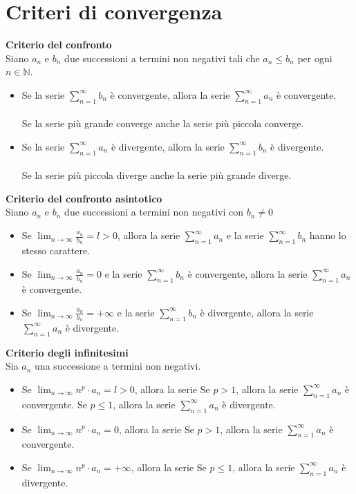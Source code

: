 \documentclass{article}
\begin{document}
\section*{Criteri di convergenza}
\textbf{Criterio del confronto}\\
Siano $a_n$ e $b_n$ due successioni a termini non negativi tali che $a_n \leq b_n$ per ogni $n \in \mathbb{N}$.
\begin{itemize}
    \item Se la serie $\sum_{n=1}^\infty b_n$ è convergente, allora la serie
          $\sum_{n=1}^\infty a_n$ è convergente.\\\\ Se la serie più grande converge
          anche la serie più piccola converge.
    \item Se la serie $\sum_{n=1}^\infty a_n$ è divergente, allora la serie
          $\sum_{n=1}^\infty b_n$ è divergente.\\\\ Se la serie più piccola diverge anche
          la serie più grande diverge.
\end{itemize}
\textbf{Criterio del confronto asintotico}\\
Siano $a_n$ e $b_n$ due successioni a termini non negativi con $b_n \ne 0$
\begin{itemize}
    \item Se $\lim_{n \to \infty} \frac{a_n}{b_n} = l > 0$, allora la serie
          $\sum_{n=1}^\infty a_n$ e la serie $\sum_{n=1}^\infty b_n$ hanno lo stesso
          carattere.
    \item Se $\lim_{n \to \infty} \frac{a_n}{b_n} = 0$ e la serie $\sum_{n=1}^\infty b_n$
          è convergente, allora la serie $\sum_{n=1}^\infty a_n$ è convergente.
    \item Se $\lim_{n \to \infty} \frac{a_n}{b_n} = +\infty$ e la serie
          $\sum_{n=1}^\infty b_n$ è divergente, allora la serie $\sum_{n=1}^\infty a_n$ è
          divergente.
\end{itemize}
\textbf{Criterio degli infinitesimi}\\
Sia $a_n$ una successione a termini non negativi.
\begin{itemize}
    \item Se $\lim_{n \to \infty} n^p \cdot a_n = l>0$, allora la serie
          \subitem Se $p>1$, allora la serie $\sum_{n=1}^\infty a_n$ è convergente.
            \subitem Se $p \leq 1$, allora la serie $\sum_{n=1}^\infty a_n$ è divergente.
    \item Se $\lim_{n \to \infty} n^p \cdot a_n = 0$, allora la serie
    \subitem Se $p>1$, allora la serie $\sum_{n=1}^\infty a_n$ è convergente.
    \item  Se $\lim_{n \to \infty} n^p \cdot a_n = +\infty$, allora la serie
    \subitem Se $p \leq 1$, allora la serie $\sum_{n=1}^\infty a_n$ è divergente.
\end{itemize}
\end{document}
